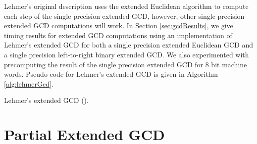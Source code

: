 \documentclass{ucalgthes1}
\theoremstyle{definition}
\newcommand{\algnewline}{\par\noindent\hskip\algorithmicindent}
\newcommand{\ZZ}{\mathbb{Z}}
\newcommand{\matrixtt}[4]{\left[ \begin{array}{rr} #1 & #2 \\ #3 & #4 \end{array} \right]}
\newcommand{\matrixThreeTwo}[6]{\left[ \begin{array}{rrr} #1 & #2 & #3 \\ #4 & #5 & #6 \end{array} \right]}
\newcommand{\floor}[1]{\left\lfloor #1 \right\rfloor}
\begin{document}
Lehmer's original description \cite{Lehmer1938} uses the extended Euclidean algorithm to compute each step of the single precision extended GCD, however, other single precision extended GCD computations will work.  In Section \ref{sec:gcdResults}, we give timing results for extended GCD computations using an implementation of Lehmer's extended GCD for both a single precision extended Euclidean GCD and a single precision left-to-right binary extended GCD.  We also experimented with precomputing the result of the single precision extended GCD for 8 bit machine words.  Pseudo-code for Lehmer's extended GCD is given in Algorithm \ref{alg:lehmerGcd}.


\begin{algorithm}[htb]
\caption{Lehmer's extended GCD (\cite{Lehmer1938}).}
\label{alg:lehmerGcd}
\end{algorithm}


\section{Partial Extended GCD}
\label{sec:gcdPartial}
\end{document}
